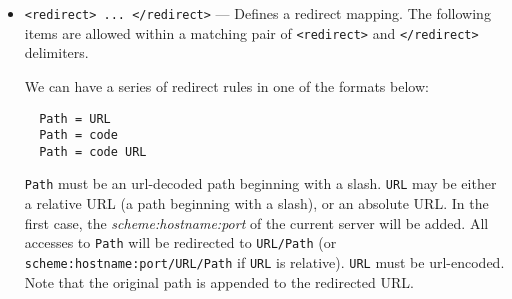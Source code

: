\documentclass[11pt,oneside,english]{book}
\newcommand{\Erlang}            %
        {{\sc Erlang}}
\newcommand{\Yaws}            %
        {{\sc Yaws}}
\begin{document}
\begin{itemize}
\begin{itemize}
                 http://www.erlang.org/doc/man/ssl.html for more details.

                 \textbf{WARNING: This option was introduced in the SSL application
                   in Erlang/OTP 18.0, so \Yaws\  ignores it for previous releases.}

               \item \verb+honor_cipher_order = true | false+ --- If true (the
                 default), use the server's preference for cipher selection. If
                 false, use the client's preference.

                 \textbf{WARNING: This option was introduced in the SSL application
                   in Erlang/OTP 17.0, so \Yaws\  ignores it for previous releases.}

                 \item \verb+protocol_version = ProtocolList+ ---
                   Specifies the list of SSL protocols that will be
                   supported. If not set, defaults to all protocols
                   supported by the \Erlang\  \verb+ssl+ application. For
                   example, to support only TLS versions 1.2, 1.1, and 1:

\begin{verbatim}
protocol_version = tlsv1.2, tlsv1.1, tlsv1
\end{verbatim}

                 \item \verb+require_sni = true | false+ ---
                   If \textit{true}, the server will reject non SNI clients and
                   clients providing an unknown SNI hostname (this last remark
                   is only relevant for the first virtual server of a SSL
                   group). This directive is ignored if SNI support is disabled
                   (or not supported).
                   Default is \textit{false}.
               \end{itemize}

\item       \verb+<redirect> ... </redirect>+ ---
              Defines a redirect mapping. The following items are allowed within
              a matching pair of \verb+<redirect>+ and \verb+</redirect>+
              delimiters.

              We can have a series of redirect rules in one of the formats below:
\begin{verbatim}
  Path = URL
  Path = code
  Path = code URL
\end{verbatim}
              \verb+Path+ must be an url-decoded path beginning with a
              slash. \verb+URL+ may be either a relative URL (a path beginning
              with a slash), or an absolute URL. In the first case, the
              \textit{scheme:hostname:port} of the current server will be
              added. All accesses to \verb+Path+ will be redirected to
              \verb+URL/Path+ (or \\ \verb+scheme:hostname:port/URL/Path+ if
              \verb+URL+ is relative). \verb+URL+ must be url-encoded. Note that
              the original path is appended to the redirected URL.


\end{itemize}
\end{document}
